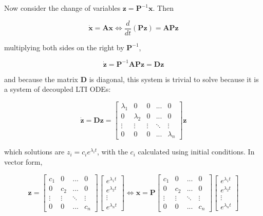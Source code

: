 	Now consider the change of variables $\mathbf{z} = \mathbf{P}^{-1}\mathbf{x}$. Then

\begin{equation} \dot{\mathbf{x}} = \mathbf{Ax} \Leftrightarrow \dfrac{d}{dt}\left( \mathbf{P}\mathbf{z}\right) = \mathbf{A} \mathbf{P}\mathbf{z}\end{equation}

	\noindent multiplying both sides on the right by $\mathbf{P}^{-1}$,

\begin{equation} \dot{\mathbf{z}} = \mathbf{P}^{-1}\mathbf{A} \mathbf{P}\mathbf{z} = \mathbf{Dz}\end{equation}

	\noindent and because the matrix $\mathbf{D}$ is diagonal, this system is trivial to solve because it is a system of decoupled LTI ODEs:

\begin{equation} \dot{\mathbf{z}} = \mathbf{Dz} = \left[\begin{array}{ccccc}\lambda_1 & 0 & 0 & ... & 0 \\[3mm] 0 & \lambda_2 & 0 & ... & 0 \\[3mm] \vdots & \vdots & \vdots & \ddots & \vdots \\[3mm] 0 & 0 & 0 & ... & \lambda_n \end{array}\right] \mathbf{z} \label{theo:homogenous_solutions_ltiode_diagonalz}\end{equation}

	which solutions are $z_i = c_i e^{\lambda_i t}$, with the $c_i$ calculated using initial conditions. In vector form,

\begin{equation} \mathbf{z} = \left[\begin{array}{cccc} c_1 & 0 & ... & 0 \\[3mm] 0 & c_2 & ... & 0 \\[3mm] \vdots & \vdots & \ddots & \vdots \\[3mm] 0 & 0 & ... & c_n \end{array}\right] \left[\begin{array}{c} e^{\lambda_1 t} \\[3mm] e^{\lambda_2 t} \\[3mm] \vdots \\[3mm] e^{\lambda_n t} \end{array}\right] \Leftrightarrow \mathbf{x} = \mathbf{P}\left[\begin{array}{cccc} c_1 & 0 & ... & 0 \\[3mm] 0 & c_2 & ... & 0 \\[3mm] \vdots & \vdots & \ddots & \vdots \\[3mm] 0 & 0 & ... & c_n \end{array}\right] \left[\begin{array}{c} e^{\lambda_1 t} \\[3mm] e^{\lambda_2 t} \\[3mm] \vdots \\[3mm] e^{\lambda_n t} \end{array}\right]\end{equation}

